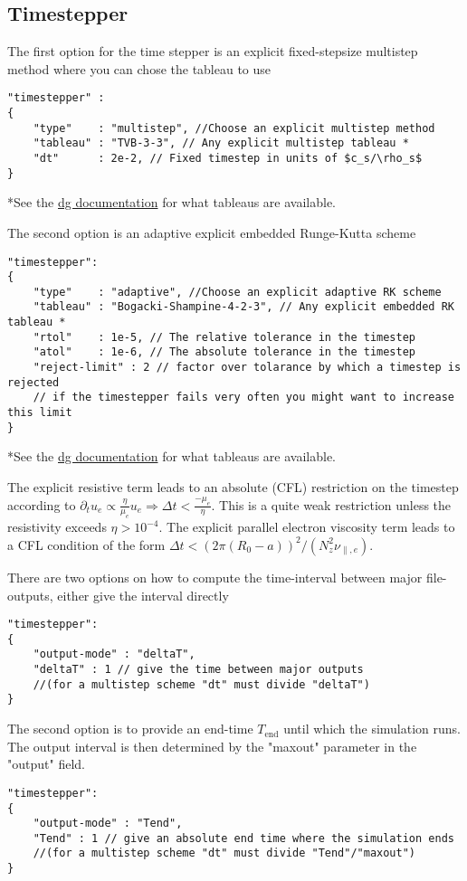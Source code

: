 \subsection{Timestepper}
The first option for the time stepper is an explicit fixed-stepsize multistep method
where you can chose the tableau to use
\begin{verbatim}
"timestepper" :
{
    "type"    : "multistep", //Choose an explicit multistep method
    "tableau" : "TVB-3-3", // Any explicit multistep tableau *
    "dt"      : 2e-2, // Fixed timestep in units of $c_s/\rho_s$
}
\end{verbatim}
*See the \href{https://feltor-dev.github.io/doc/dg/html/structdg_1_1_explicit_multistep.html}{dg documentation} for what tableaus are available.

The second option is an adaptive explicit embedded Runge-Kutta scheme
\begin{verbatim}
"timestepper":
{
    "type"    : "adaptive", //Choose an explicit adaptive RK scheme
    "tableau" : "Bogacki-Shampine-4-2-3", // Any explicit embedded RK tableau *
    "rtol"    : 1e-5, // The relative tolerance in the timestep
    "atol"    : 1e-6, // The absolute tolerance in the timestep
    "reject-limit" : 2 // factor over tolarance by which a timestep is rejected
    // if the timestepper fails very often you might want to increase this limit
}
\end{verbatim}
*See the \href{https://feltor-dev.github.io/doc/dg/html/structdg_1_1_e_r_k_step.html}{dg documentation} for what tableaus are available.

\begin{tcolorbox}[title=Note]
The explicit resistive term leads to an absolute (CFL) restriction
on the timestep according to $\partial_t u_e \propto \frac{\eta}{\mu_e} u_e \Rightarrow \Delta t < \frac{-\mu_e}{\eta}$. This is a quite weak restriction unless the resistivity exceeds $\eta > 10^{-4}$.
The explicit parallel electron viscosity term leads to a CFL condition of the
form $\Delta t < (2\pi (R_0 - a))^2/(N_z^2 \nu_{\parallel,e})$.
\end{tcolorbox}


There are two options on how to compute the time-interval between major file-outputs,
either give the interval directly
\begin{verbatim}
"timestepper":
{
    "output-mode" : "deltaT",
    "deltaT" : 1 // give the time between major outputs
    //(for a multistep scheme "dt" must divide "deltaT")
}
\end{verbatim}
The second option is to provide an end-time $T_{\text{end}}$
until which the simulation runs. The output interval is then determined by the "maxout" parameter in the "output" field.
\begin{verbatim}
"timestepper":
{
    "output-mode" : "Tend",
    "Tend" : 1 // give an absolute end time where the simulation ends
    //(for a multistep scheme "dt" must divide "Tend"/"maxout")
}
\end{verbatim}

